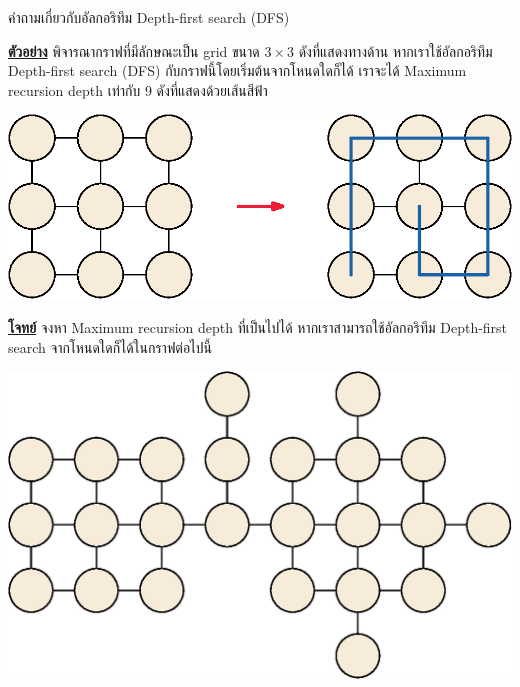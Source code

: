\question{}

คำถามเกี่ยวกับอัลกอริทึม Depth-first search (DFS)

\smallskip\noindent
\textbf{\uline{ตัวอย่าง}}\; พิจารณากราฟที่มีลักษณะเป็น grid ขนาด $\mathrm{3} \times \mathrm{3}$ 
ดังที่แสดงทางด้าน%
{\ifodd{}\fi} 
หากเราใช้อัลกอริทึม Depth-first search (DFS) กับกราฟนี้โดยเริ่มต้นจากโหนดใดก็ได้ 
เราจะได้ Maximum recursion depth เท่ากับ 9 ดังที่แสดงด้วยเส้นสีฟ้า

\begin{center}
    \bigskip
    \includegraphics[scale=0.6]{figures/quickfire_north_regional_recursiondepth_01.eps}
\end{center}

\noindent
\textbf{\uline{โจทย์}}\; จงหา Maximum recursion depth ที่เป็นไปได้ 
หากเราสามารถใช้อัลกอริทึม Depth-first search จากโหนดใดก็ได้ในกราฟต่อไปนี้
\begin{center}
    \bigskip
    \includegraphics[scale=0.6]{figures/quickfire_north_regional_recursiondepth_02.eps}
\end{center}
